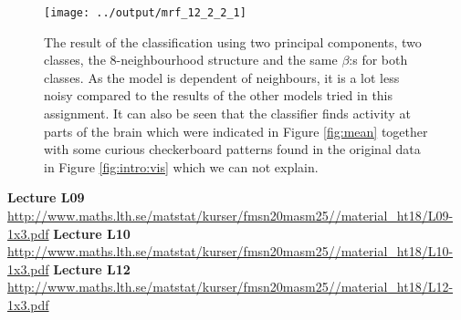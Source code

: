\documentclass[a4paper,english]{article}
\begin{document}
\begin{figure}[H]
	\centering
    \texttt{[image: ../output/mrf\_12\_2\_2\_1]}
    \caption{The result of the classification using two principal components, two classes, the 8-neighbourhood structure and the same $\beta$:s for both classes. As the model is dependent of neighbours, it is a lot less noisy compared to the results of the other models tried in this assignment. It can also be seen that the classifier finds activity at parts of the brain which were indicated in Figure \ref{fig:mean} together with some curious checkerboard patterns found in the original data in Figure \ref{fig:intro:vis} which we can not explain.}
    \label{fig:mrf}
\end{figure}

\newpage

\begin{thebibliography}{37}
  \textbf{Lecture L09} \\
\url{http://www.maths.lth.se/matstat/kurser/fmsn20masm25//material_ht18/L09-1x3.pdf}
  \textbf{Lecture L10} \\
\url{http://www.maths.lth.se/matstat/kurser/fmsn20masm25//material_ht18/L10-1x3.pdf}
  \textbf{Lecture L12} \\
\url{http://www.maths.lth.se/matstat/kurser/fmsn20masm25//material_ht18/L12-1x3.pdf}
\end{thebibliography}
\pagebreak{}

\pagebreak{}
\thispagestyle{empty}
\end{document}
